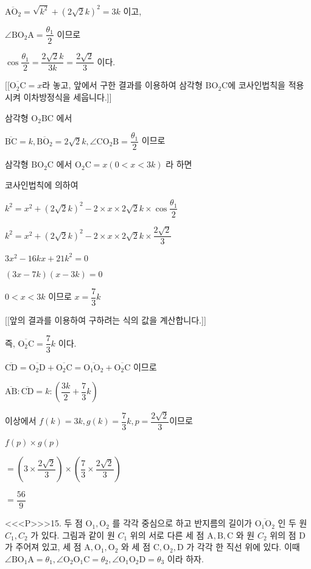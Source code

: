 \documentclass{oblivoir}
\begin{document}
$\overline{\mathrm{AO}_{2}}=\sqrt{k^{2}}+(2 \sqrt{2} k)^{2}=3 k$ 이고,

$\angle \mathrm{BO}_{2} \mathrm{A}=\dfrac{\theta_{1}}{2}$ 이므로

$\cos \dfrac{\theta_{1}}{2}=\dfrac{2 \sqrt{2} k}{3 k}=\dfrac{2 \sqrt{2}}{3}$ 이다.

[[$\overline{\mathrm{O_{2} C}}=x$라 놓고, 앞에서 구한 결과를 이용하여 삼각형 $\mathrm{BO_{2} C}$에 코사인법칙을 적용시켜 이차방정식을 세웁니다.]]

삼각형 $\mathrm{O}_{2} \mathrm{BC}$ 에서

$\overline{\mathrm{BC}}=k, \overline{\mathrm{BO}_{2}}=2 \sqrt{2} k, \angle \mathrm{CO}_{2} \mathrm{B}=\dfrac{\theta_{1}}{2}$ 이므로

삼각형 $\mathrm{BO}_{2} \mathrm{C}$ 에서
$\mathrm{O}_{2} \mathrm{C}=x(0<  x<  3 k)$ 라 하면

코사인법칙에 의하여

$k^{2}=x^{2}+(2 \sqrt{2} k)^{2}-2 \times x \times 2 \sqrt{2} k \times \cos \dfrac{\theta_{1}}{2}$

$k^{2}=x^{2}+(2 \sqrt{2} k)^{2}-2 \times x \times 2 \sqrt{2} k \times \dfrac{2 \sqrt{2}}{3}$

$3 x^{2}-16 k x+21 k^{2}=0$

$(3 x-7 k)(x-3 k)=0$

$0<  x<  3 k$ 이므로 $x=\dfrac{7}{3} k$

[[앞의 결과를 이용하여 구하려는 식의 값을 계산합니다.]]

즉, $\overline{\mathrm{O}_{2} \mathrm{C}}=\boxed{\dfrac{7}{3} k}$ 이다.

$\overline{\mathrm{CD}}=\overline{\mathrm{O}_{2} \mathrm{D}}+\overline{\mathrm{O}_{2} \mathrm{C}}=\overline{\mathrm{O}_{1} \mathrm{O}_{2}}+\overline{\mathrm{O}_{2} \mathrm{C}}$ 이므로

$\overline{\mathrm{AB}}: \overline{\mathrm{CD}}=k:\left(\dfrac{\boxed{3 k}}{2}+\boxed{\dfrac{7}{3} k}\right)$

이상에서 $f(k)=3 k, g(k)=\dfrac{7}{3} k, p=\dfrac{2 \sqrt{2}}{3}$이므로

$f(p) \times g(p)$

$=\left(3 \times \dfrac{2 \sqrt{2}}{3}\right) \times\left(\dfrac{7}{3} \times \dfrac{2 \sqrt{2}}{3}\right)$

$=\dfrac{56}{9}$



<<<P>>>15. 두 점 $\mathrm{O}_{1}, \mathrm{O}_{2}$ 를 각각 중심으로 하고 반지름의 길이가 $\overline{\mathrm{O}_{1} \mathrm{O}_{2}}$ 인 두 원 $C_{1}, C_{2}$ 가 있다. 그림과 같이 원 $C_{1}$ 위의 서로 다른 세 점 $\mathrm{A}, \mathrm{B}, \mathrm{C}$ 와 원 $C_{2}$ 위의 점 $\mathrm{D}$ 가 주어져 있고, 세 점 $\mathrm{A}, \mathrm{O}_{1}, \mathrm{O}_{2}$ 와 세 점 $\mathrm{C}, \mathrm{O}_{2}, \mathrm{D}$ 가 각각 한 직선 위에 있다.
이때 $\angle \mathrm{BO}_{1} \mathrm{A}=\theta_{1}, \angle \mathrm{O}_{2} \mathrm{O}_{1} \mathrm{C}=\theta_{2}, \angle \mathrm{O}_{1} \mathrm{O}_{2} \mathrm{D}=\theta_{3}$ 이라 하자.
\end{document}
